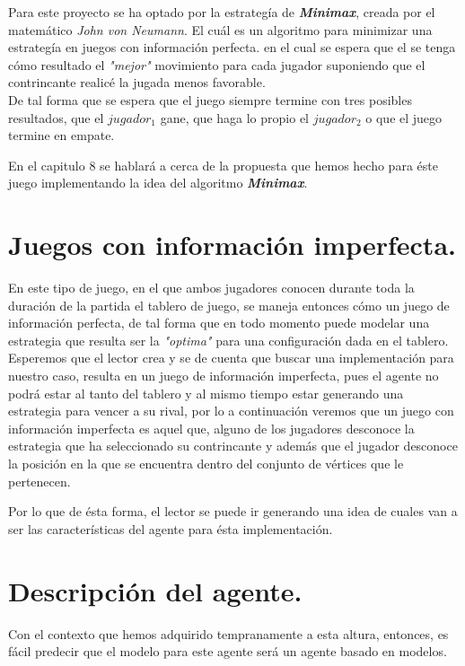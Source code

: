 \documentclass[12pt]{article}
\begin{document}
Para este proyecto se ha optado por la estrateg\'ia de \textbf{\textit{Minimax}}, creada por el matem\'atico \textit{John von Neumann}. El cu\'al es un algoritmo para minimizar una estrateg\'ia en juegos con informaci\'on perfecta.\cite{minimax1} en el cual se espera que el se tenga c\'omo resultado el \textit{"mejor"} movimiento para cada jugador suponiendo que el contrincante realic\'e la jugada menos favorable.\\
De tal forma que se espera que el juego siempre termine con tres posibles resultados, que el $jugador_{1}$ gane, que haga lo propio el $jugador_{2}$ o que el juego termine en empate.

En el capitulo 8 se hablar\'a a cerca de la propuesta que hemos hecho para \'este juego implementando la idea del algoritmo \textbf{\textit{Minimax}}.

\section{Juegos con informaci\'on imperfecta.}
En este tipo de juego, en el que ambos jugadores conocen durante toda la duraci\'on de la partida el tablero de juego, se maneja entonces c\'omo un juego de informaci\'on perfecta, de tal forma que en todo momento puede modelar una estrategia que resulta ser la \textit{"optima"} para una configuraci\'on dada en el tablero\cite{informacionPerfecta}.\\
Esperemos que el lector crea y se de cuenta que buscar una implementaci\'on para nuestro caso, resulta en un juego de informaci\'on imperfecta, pues el agente no podr\'a estar al tanto del tablero y al mismo tiempo estar generando una estrategia para vencer a su rival, por lo a continuaci\'on veremos que un juego con informaci\'on imperfecta es aquel que, alguno de los jugadores desconoce la estrategia que ha seleccionado su contrincante y adem\'as que el jugador desconoce la posici\'on en la que se encuentra dentro del conjunto de v\'ertices que le pertenecen\cite{informacionImperfecta}.

Por lo que de \'esta forma, el lector se puede ir generando una idea de cuales van a ser las caracter\'isticas del agente para \'esta implementaci\'on.


\section{Descripci\'on del agente.}
Con el contexto que hemos adquirido tempranamente a esta altura, entonces, es f\'acil predecir que el modelo para este agente ser\'a un agente basado en modelos.
\end{document}
